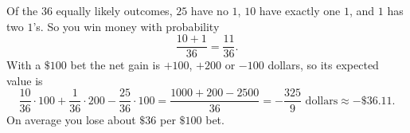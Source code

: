 Of the $36$ equally likely outcomes, $25$ have no $1$, $10$ have exactly one $1$, and $1$ has two $1$'s. So you win money with probability
\[\dfrac{10+1}{36}=\boxed{\dfrac{11}{36}}.\]
With a $\$100$ bet the net gain is $+100$, $+200$ or $-100$ dollars, so its expected value is
\[\dfrac{10}{36}\cdot100+\dfrac{1}{36}\cdot200-\dfrac{25}{36}\cdot100=\dfrac{1000+200-2500}{36}=\boxed{-\dfrac{325}{9}\text{ dollars}}\approx-\$36.11.\]
On average you lose about $\$36$ per $\$100$ bet.
